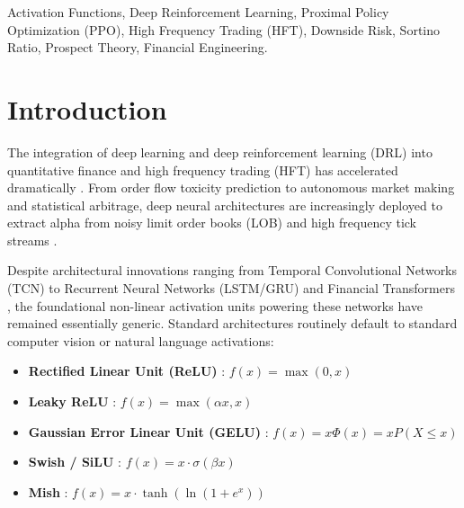 \documentclass[conference]{IEEEtran}
\begin{document}
\begin{IEEEkeywords}
Activation Functions, Deep Reinforcement Learning, Proximal Policy Optimization (PPO), High Frequency Trading (HFT), Downside Risk, Sortino Ratio, Prospect Theory, Financial Engineering.
\end{IEEEkeywords}

\section{Introduction}
The integration of deep learning and deep reinforcement learning (DRL) into quantitative finance and high frequency trading (HFT) has accelerated dramatically \cite{moody2001learning, dixon2020machine}. From order flow toxicity prediction to autonomous market making and statistical arbitrage, deep neural architectures are increasingly deployed to extract alpha from noisy limit order books (LOB) and high frequency tick streams \cite{cartea2015algorithmic}.

Despite architectural innovations ranging from Temporal Convolutional Networks (TCN) to Recurrent Neural Networks (LSTM/GRU) and Financial Transformers \cite{li2019enhancing}, the foundational non-linear activation units powering these networks have remained essentially generic. Standard architectures routinely default to standard computer vision or natural language activations:
\begin{itemize}
    \item \textbf{Rectified Linear Unit (ReLU)} \cite{nair2010rectified}: $f(x) = \max(0, x)$
    \item \textbf{Leaky ReLU} \cite{maas2013rectifier}: $f(x) = \max(\alpha x, x)$
    \item \textbf{Gaussian Error Linear Unit (GELU)} \cite{hendrycks2016gelu}: $f(x) = x \Phi(x) = x P(X \le x)$
    \item \textbf{Swish / SiLU} \cite{ramachandran2017swish, elfwing2018sigmoid}: $f(x) = x \cdot \sigma(\beta x)$
    \item \textbf{Mish} \cite{misra2020mish}: $f(x) = x \cdot \tanh(\ln(1 + e^x))$
\end{itemize}
\end{document}

